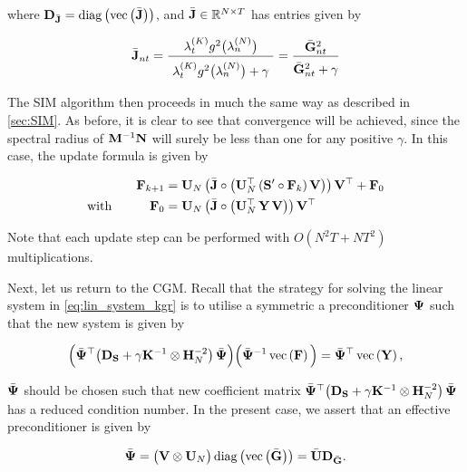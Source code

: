 where $\mathbf{D}_{\bar{\mathbf{J}}} = \text{\textup{diag}}\left(\text{\textup{vec}}\left(\bar{\mathbf{J}}\right)\right)$, and $\bar{\mathbf{J}} \in \mathbb{R}^{N \times T}$ has entries given by 

\begin{equation}
    \label{eq:Jnt2}
    \bar{\J}_{nt} = \frac{\lambda^{(K)}_t g^2\big(\lambda_n^{(N)}\big)}{ \raisebox{-0.2cm} { $\lambda^{(K)}_t g^2\big(\lambda_n^{(N)}\big) + \gamma$ } } = \frac{\bar{\G}_{nt}^2}{ \raisebox{-0.15cm} {$\bar{\G}_{nt}^2 + \gamma$}}
\end{equation}

The SIM algorithm then proceeds in much the same way as described in \cref{sec:SIM}. As before, it is clear to see that convergence will be achieved, since the spectral radius of $\mathbf{M}^{-1}\mathbf{N}$ will surely be less than one for any positive $\gamma$. In this case, the update formula is given by 

\begin{align}
    \label{eq:update_sim_kgr}
    \mathbf{F}_{k+1} & = \mathbf{U}_N \, \big( \bar{\mathbf{J}}  \circ \big( \mathbf{U}_N^\top \, (\mathbf{S}' \circ \mathbf{F}_{k})\, \mathbf{V} \big) \big) \, \mathbf{V}^\top + \mathbf{F}_0 \\
    \label{eq:update_sim_kgr2}
    \text{with} \quad\quad\quad \mathbf{F}_0 & = \mathbf{U}_N \, \big( \bar{\mathbf{J}}  \circ \big( \mathbf{U}_N^\top \, \mathbf{Y} \, \mathbf{V} \big) \big) \, \mathbf{V}^\top 
\end{align}

Note that each update step can be performed with $O(N^2T + NT^2)$ multiplications. 

Next, let us return to the CGM. Recall that the strategy for solving the linear system in \cref{eq:lin_system_kgr} is to utilise a symmetric a preconditioner $\mathbf{\Psi}$ such that the new system is given by 

\begin{equation}
    \Big(\bar{\mathbf{\Psi}} ^\top  \big(\mathbf{D}_{\mathbf{S}} + \gamma \mathbf{K}^{-1} \otimes \mathbf{H}_N^{-2} \big) \, \bar{\mathbf{\Psi}}   \Big) \Big(\bar{\mathbf{\Psi}} ^{-1}\, \text{\textup{vec}}\left( \mathbf{F} \right) \Big) = \bar{\mathbf{\Psi}} ^\top \, \text{\textup{vec}}\left(\mathbf{Y}\right),
\end{equation}

$\bar{\mathbf{\Psi}} $ should be chosen such that new coefficient matrix $\bar{\mathbf{\Psi}} ^\top \big(\mathbf{D}_{\mathbf{S}} + \gamma \mathbf{K}^{-1} \otimes \mathbf{H}_N^{-2} \big) \, \bar{\mathbf{\Psi}} $ has a reduced condition number. In the present case, we assert that an effective preconditioner is given by 

\begin{equation}
    \bar{\mathbf{\Psi}} = \big(\mathbf{V} \otimes \mathbf{U}_N \big) \, \text{\textup{diag}}\left(\text{\textup{vec}}\left(\bar{\mathbf{G}}\right)\right) = \bar{\mathbf{U}} \mathbf{D}_{\bar{\mathbf{G}}}.
\end{equation}

